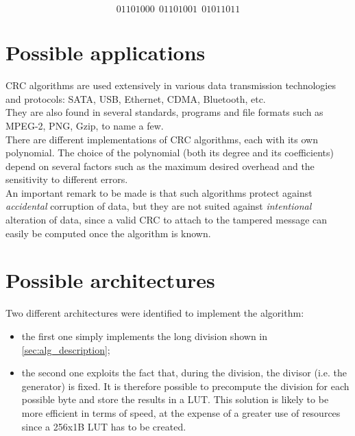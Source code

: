 	\begin{equation}
	01101000\:\:01101001\:\:01011011
	\label{eq:example_with_FCS}	
	\end{equation}


\section{Possible applications}\label{sec:applications}
CRC algorithms are used extensively in various data transmission technologies and protocols: SATA, USB, Ethernet, CDMA, Bluetooth, etc.\\
They are also found in several standards, programs and file formats such as MPEG-2, PNG, Gzip, to name a few.\\
There are different implementations of CRC algorithms, each with its own polynomial. The choice of the polynomial (both its degree and its coefficients) depend on several factors such as the maximum desired overhead and the sensitivity to different errors.\\

\noindent An important remark to be made is that such algorithms protect against \textit{accidental} corruption of data, but they are not suited against \textit{intentional} alteration of data, since a valid CRC to attach to the tampered message can easily be computed once the algorithm is known.

\section{Possible architectures}\label{sec:architectures}
Two different architectures were identified to implement the algorithm:
\begin{itemize}
\item the first one simply implements the long division shown in \ref{sec:alg_description};\\
\item the second one exploits the fact that, during the division, the divisor (i.e. the generator) is fixed. It is therefore possible to precompute the division for each possible byte and store the results in a LUT. This solution is likely to be more efficient in terms of speed, at the expense of a greater use of resources since a 256x1B LUT has to be created.
\end{itemize}